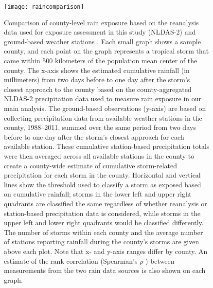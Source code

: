 \documentclass[11pt, titlepage]{article}
\begin{document}
\begin{figure}[tbhp!]
\centering
\texttt{[image: raincomparison]}
\caption{Comparison of county-level rain exposure based on the reanalysis data used for exposure assessment in this study (NLDAS-2) \citep{rui2013nldas, alhamdan2014environmental} and ground-based weather stations \citep{menne2012overview, rnoaa, countyweather}. Each small graph shows a sample county, and each point on the graph represents a tropical storm that came within 500 kilometers of the population mean center of the county. The x-axis shows the estimated cumulative rainfall (in millimeters) from two days before to one day after the storm's closest approach to the county based on the county-aggregated NLDAS-2 precipitation data used to measure rain exposure in our main analysis. The ground-based observations (y-axis) are based on collecting precipitation data from available weather stations in the county, 1988--2011, summed over the same period from two days before to one day after the storm's closest approach for each available station. These cumulative station-based precipitation totals were then averaged across all available stations in the county to create a county-wide estimate of cumulative storm-related precipitation for each storm in the county. Horizontal and vertical lines show the threshold used to classify a storm as exposed based on cumulative rainfall; storms in the lower left and upper right quadrants are classified the same regardless of whether reanalysis or station-based precipitation data is considered, while storms in the upper left and lower right quadrants would be classified differently. The number of storms within each county and the average number of stations reporting rainfall during the county's storms are given above each plot. Note that x- and y-axis ranges differ by county. An estimate of the rank correlation (Spearman's $\rho$ \citep{spearman1904proof}) between measurements from the two rain data sources is also shown on each graph.}
\label{fig:raincomparison}
\end{figure}
\end{document}
